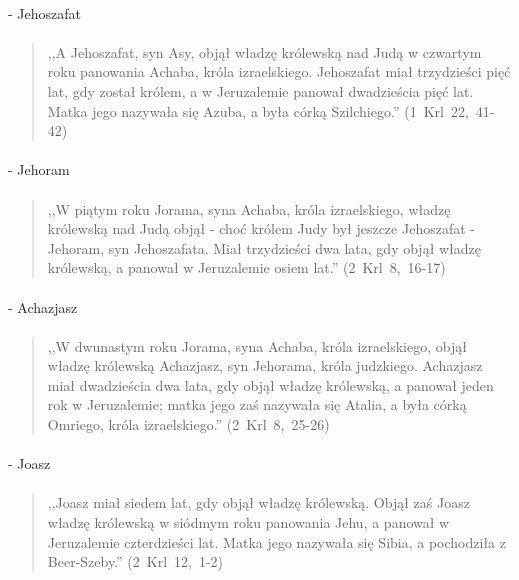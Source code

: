 \documentclass[10pt,a4paper,oneside]{article}
\begin{document}
\paragraph{}
- Jehoszafat
\paragraph{}
\begin{quote}
,,A Jehoszafat, syn Asy, objął władzę królewską nad Judą w czwartym roku panowania Achaba, króla izraelskiego. Jehoszafat miał trzydzieści pięć lat, gdy został królem, a w Jeruzalemie panował dwadzieścia pięć lat. Matka jego nazywała się Azuba, a była córką Szilchiego.'' \mbox{(1 Krl 22, 41-42)}
\end{quote}
\paragraph{}
- Jehoram
\paragraph{}
\begin{quote}
,,W piątym roku Jorama, syna Achaba, króla izraelskiego, władzę królewską nad Judą objął - choć królem Judy był jeszcze Jehoszafat - Jehoram, syn Jehoszafata. Miał trzydzieści dwa lata, gdy objął władzę królewską, a panował w Jeruzalemie osiem lat.'' \mbox{(2 Krl 8, 16-17)}
\end{quote}
\paragraph{}
- Achazjasz
\paragraph{}
\begin{quote}
,,W dwunastym roku Jorama, syna Achaba, króla izraelskiego, objął władzę królewską Achazjasz, syn Jehorama, króla judzkiego. Achazjasz miał dwadzieścia dwa lata, gdy objął władzę królewską, a panował jeden rok w Jeruzalemie; matka jego zaś nazywała się Atalia, a była córką Omriego, króla izraelskiego.'' \mbox{(2 Krl 8, 25-26)}
\end{quote}
\paragraph{}
- Joasz
\paragraph{}
\begin{quote}
,,Joasz miał siedem lat, gdy objął władzę królewską. Objął zaś Joasz władzę królewską w siódmym roku panowania Jehu, a panował w Jeruzalemie czterdzieści lat. Matka jego nazywała się Sibia, a pochodziła z Beer-Szeby.'' \mbox{(2 Krl 12, 1-2)}
\end{quote}
\end{document}
